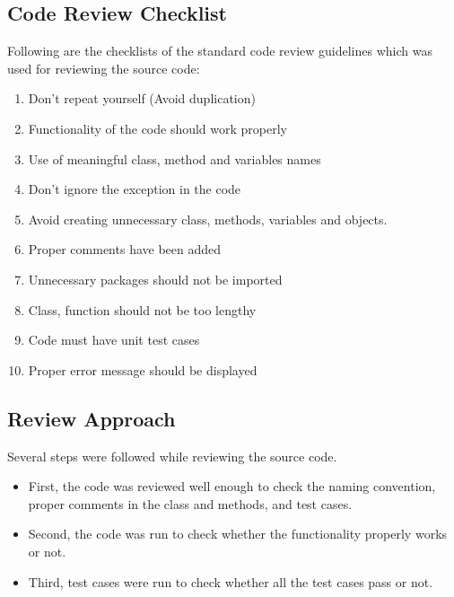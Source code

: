 \documentclass[a4paper,12pt]{article}
\begin{document}
    \subsection{Code Review Checklist}
    Following are the checklists of the standard code review guidelines which was used for reviewing the source code:
    \begin{enumerate}
        \item Don’t repeat yourself (Avoid duplication)
        \item Functionality of the code should work properly
        \item Use of meaningful class, method and variables names
        \item Don’t ignore the exception in the code
        \item Avoid creating unnecessary class, methods, variables and objects.
        \item Proper comments have been added
        \item Unnecessary packages should not be imported
        \item Class, function should not be too lengthy
        \item Code must have unit test cases
        \item Proper error message should be displayed
    \end{enumerate}
    
    \subsection{Review Approach}
    Several steps were followed while reviewing the source code.
    \begin{itemize}
        \item First, the code was reviewed well enough to check the naming convention, proper comments in the class and methods, and test cases.
        \item Second, the code was run to check whether the functionality properly works or not.
        \item Third, test cases were run to check whether all the test cases pass or not.
    \end{itemize}
    
\end{document}
